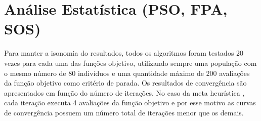 \documentclass[a4paper, 11pt]{article}
\begin{document}
\begin{figure}[!ht]
\end{figure}

\label{sec:analise_estatistica}
\section{Análise Estatística (PSO, FPA, SOS)}

Para manter a isonomia do resultados, todos os algoritmos foram testados 20 vezes para
cada uma das funções objetivo, utilizando sempre uma população com o mesmo número de 
80 indivíduos e uma quantidade máximo de 200 avaliações da função objetivo como critério 
de parada. Os resultados de convergência são apresentados em função do número de iterações. 
No caso da meta heurística , cada iteração executa 4 avaliações da função objetivo
e por esse motivo as curvas de convergência possuem um número total de iterações menor que os
demais.
\end{document}
